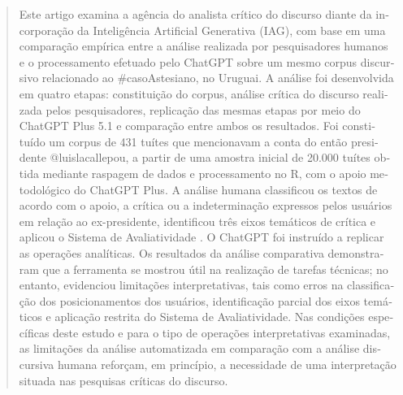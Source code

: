 \documentclass[spanish]{textolivre}
\begin{document}
\begin{polyabstract}
\begin{portuguese}
\begin{abstract}
Este artigo examina a agência do analista crítico do discurso diante da incorporação da Inteligência Artificial Generativa (IAG), com base em uma comparação empírica entre a análise realizada por pesquisadores humanos e o processamento efetuado pelo ChatGPT sobre um mesmo corpus discursivo relacionado ao \#casoAstesiano, no Uruguai. A análise foi desenvolvida em quatro etapas: constituição do corpus, análise crítica do discurso realizada pelos pesquisadores, replicação das mesmas etapas por meio do ChatGPT Plus 5.1 e comparação entre ambos os resultados. Foi constituído um corpus de 431 tuítes que mencionavam a conta do então presidente @luislacallepou, a partir de uma amostra inicial de 20.000 tuítes obtida mediante raspagem de dados e processamento no R, com o apoio metodológico do ChatGPT Plus. A análise humana classificou os textos de acordo com o apoio, a crítica ou a indeterminação expressos pelos usuários em relação ao ex-presidente, identificou três eixos temáticos de crítica e aplicou o Sistema de Avaliatividade \cite{martin2005language}. O ChatGPT foi instruído a replicar as operações analíticas. Os resultados da análise comparativa demonstraram que a ferramenta se mostrou útil na realização de tarefas técnicas; no entanto, evidenciou limitações interpretativas, tais como erros na classificação dos posicionamentos dos usuários, identificação parcial dos eixos temáticos e aplicação restrita do Sistema de Avaliatividade. Nas condições específicas deste estudo e para o tipo de operações interpretativas examinadas, as limitações da análise automatizada em comparação com a análise discursiva humana reforçam, em princípio, a necessidade de uma interpretação situada nas pesquisas críticas do discurso.

\end{abstract}
\end{portuguese}


\end{polyabstract}
\end{document}
